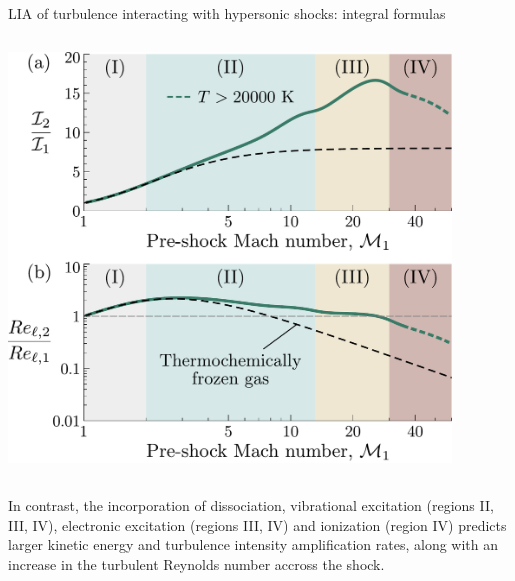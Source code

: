 \documentclass[9pt, aspectratio=1609]{beamer}
\begin{document}
\begin{frame}{\large LIA of turbulence interacting with hypersonic shocks: integral formulas}
\begin{columns}[c]
\begin{column}{.45\textwidth}
\begin{center}
        \includegraphics[width=0.88\textwidth]{figures/aiaa2023/Ratios_AIAA2023_labels.pdf}
    \end{center}
    \end{column}%
\end{columns}
\vspace{0.3cm}
In contrast, the incorporation of dissociation, vibrational excitation (regions II, III, IV), electronic excitation (regions III, IV) and ionization (region IV) predicts larger kinetic energy and turbulence intensity amplification rates, along with an increase in the turbulent Reynolds number accross the shock.
\end{frame}
\end{document}
